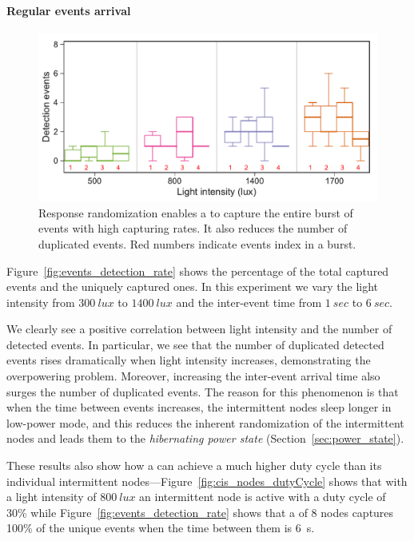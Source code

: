 \paragraph{Regular events arrival}
\begin{figure}[t]
	\centering
     \includegraphics[width=\columnwidth]{figures/events_burst_rand}
    \caption{Response randomization enables a \sys to capture the entire burst of events with high capturing rates. It also reduces the number of duplicated events. Red numbers indicate events index in a burst.}
    \label{fig:events_burst_rand}
\end{figure}

Figure~\ref{fig:events_detection_rate} shows the percentage of the total captured events and the uniquely captured ones. In this experiment we vary the light intensity from $\SI{300}{lux}$ to $\SI{1400}{lux}$ and the inter-event time from $\SI{1}{sec}$ to $\SI{6}{sec}$. 

We clearly see a positive correlation between light intensity and the number of detected events. In particular, we see that the number of duplicated detected events rises dramatically when light intensity increases, demonstrating the overpowering problem. Moreover, increasing the inter-event arrival time also surges the number of duplicated events. The reason for this phenomenon is that when the time between events increases, the intermittent nodes sleep longer in low-power mode, and this reduces the inherent randomization of the intermittent nodes and leads them to the \textit{hibernating power state} (Section~\ref{sec:power_state}).  

These results also show how a \sys can achieve a much higher duty cycle than its individual intermittent nodes---Figure~\ref{fig:cis_nodes_dutyCycle} shows that with a light intensity of $\SI{800}{lux}$ an intermittent node is active with a duty cycle of 30\% while Figure~\ref{fig:events_detection_rate} shows that a \sys of 8 nodes  captures  100\% of the unique events when the time between them is \SI{6}{s}. 

